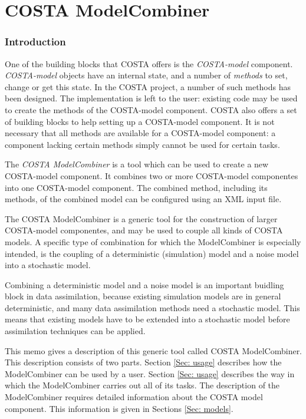 \documentclass[a4paper,12pt]{article}
\begin{document}
\part{COSTA ModelCombiner}
\section{Introduction}

One of the building blocks that COSTA offers is the 
{\em COSTA-model}
component.  {\em COSTA-model} objects have an internal state, and a number of
{\em methods} to set, change or get this state.  In the COSTA project, a
number of such methods has been designed.  The implementation is left to
the user: existing code may be used to create the methods of the
COSTA-model component.  COSTA also offers a set of building blocks to help
setting up a COSTA-model component.  It is not necessary that all methods are
available for a COSTA-model component: a component lacking certain methods
simply cannot be used for certain tasks. 

The {\em COSTA ModelCombiner} is a tool which can be used to create a new
COSTA-model component. It combines two or more COSTA-model componentes into
one COSTA-model component. The combined method, including its methods, of
the combined model can be configured using an XML input file. 

The COSTA ModelCombiner is a generic tool for the construction of larger
COSTA-model componentes, and may be used to couple all kinds of COSTA models.
A specific type of combination for which the ModelCombiner is especially
intended, is the coupling of a deterministic (simulation) model and a noise
model into a stochastic model. 

Combining a deterministic model and a noise model is an important buidling
block in data assimilation, because existing simulation models are in
general deterministic, and many data assimilation methods need a stochastic
model.  This means that existing models have to be extended into a
stochastic model before assimilation techniques can be applied.

This memo gives a description of this generic tool called COSTA 
ModelCombiner. This description consists of two parts. Section \ref{Sec:
usage} describes how the ModelCombiner can be used by a user.
 Section \ref{Sec: usage}
describes the way in which the ModelCombiner carries out all of its tasks.
The description of the ModelCombiner requires detailed information about
the COSTA model component. This information is given in Sections \ref{Sec:
models}.
\end{document}
